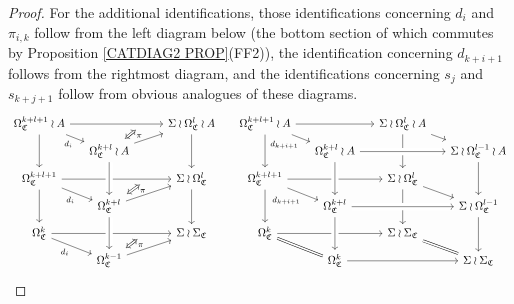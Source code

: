 \documentclass[a4paper,10pt
]{article}%
\numberwithin{equation}{section}
\numberwithin{figure}{section}
\theoremstyle{definition} %
\newcommand{\1}{\ensuremath{\mathbbm 1}}%
\begin{document}
\begin{proof}
	
	For the additional identifications, 
	those identifications concerning $d_i$ and $\pi_{i,k}$
	follow from the left diagram below 
	(the bottom section of which commutes by 
	Proposition \ref{CATDIAG2 PROP}(FF2)),
	the identification concerning $d_{k+i+1}$ follows from the rightmost diagram, and the identifications concerning 
	$s_j$ and $s_{k+j+1}$
	follow from obvious analogues of these diagrams.
	\[
	\begin{tikzcd}[row sep = 5pt,column sep = 13pt]
	\Omega^{k+l+1}_{\mathfrak{C}} \wr A \ar{rrr}[near end, name=TT,swap]{} \ar{rd}[swap]{d_i} \ar{dd} &&&
	\Sigma \wr \Omega^{l}_{\mathfrak{C}} \wr A \ar{dd}
	&
	\Omega^{k+l+1}_{\mathfrak{C}} \wr A \ar{rr} \ar{rd}[swap]{d_{k+i+1}} \ar{dd} &&
	\Sigma \wr \Omega^{l}_{\mathfrak{C}} \wr A \ar{rd} \ar{dd}
	\\
	&
	|[alias=TD]|
	\Omega^{k+l}_{\mathfrak{C}} \wr A \ar{rru} &&
	&
	&
	\Omega^{k+l}_{\mathfrak{C}} \wr A \arrow[rr, crossing over] &&
	\Sigma \wr \Omega^{l-1}_{\mathfrak{C}} \wr A 	 \ar{dd}
	\\
	\Omega^{k+l+1}_{\mathfrak{C}} \ar{rrr}[near end, name=MT,swap]{} \ar{rd}[swap]{d_i} \ar{dd} &&&
	\Sigma \wr \Omega^{l}_{\mathfrak{C}} \ar{dd}
	&
	\Omega^{k+l+1}_{\mathfrak{C}} \ar{rr} \ar{rd}[swap]{d_{k+i+1}} \ar{dd}&&
	\Sigma \wr \Omega^{l}_{\mathfrak{C}} \ar{rd} \ar{dd}
	\\
	&
	|[alias=MD]|
	\Omega^{k+l}_{\mathfrak{C}} \ar{rru} \arrow[uu, leftarrow, crossing over] &&
	&
	&
	\Omega^{k+l}_{\mathfrak{C}} \arrow[rr, crossing over] \arrow[uu, leftarrow, crossing over] &&
	\Sigma \wr \Omega^{l-1}_{\mathfrak{C}} \ar{dd}
	\\
	\Omega^{k}_{\mathfrak{C}} \ar{rrr}[near end, name=DT,swap]{} \ar{rd}[swap]{d_i} &&&
	\Sigma \wr \Sigma_{\mathfrak{C}}
	&
	\Omega^{k}_{\mathfrak{C}} \ar{rr} \ar[equal]{rd} &&
	\Sigma \wr \Sigma_{\mathfrak{C}} \ar[equal]{rd}
	\\
	&
	|[alias=DD]|
	\Omega^{k-1}_{\mathfrak{C}} \ar{rru} \arrow[uu, leftarrow, crossing over] &&
	&
	&
	\Omega^{k}_{\mathfrak{C}} \ar{rr} \arrow[uu, leftarrow, crossing over] &&
	\Sigma \wr \Sigma_{\mathfrak{C}} 
	\arrow[Leftrightarrow, from=TT, to=TD,shorten >=0.05cm,shorten <=0.05cm, near start,
	"\pi"
	]
	\arrow[Leftrightarrow, from=MT, to=MD,shorten >=0.05cm,shorten <=0.05cm, near start,
	"\pi"
	]
	\arrow[Leftrightarrow, from=DT, to=DD,shorten >=0.05cm,shorten <=0.05cm, near start,
	"\pi"
	]
	\end{tikzcd}
	\]
\end{proof}
\end{document}
